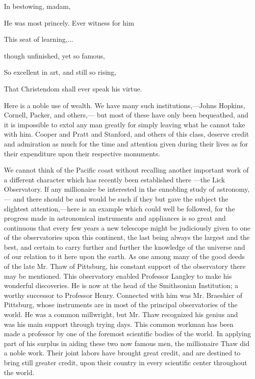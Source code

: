 \documentclass[11pt,openany]{book}
\begin{document}
In bestowing, madam,

He was most princely. Ever witness for him

This seat of learning,...

though unfinished, yet so famous,

So excellent in art, and still so rising,

That Christendom shall ever speak his virtue.

Here is a noble use of wealth. We have many such institutions,---Johns Hopkins, Cornell, Packer, and others,--- but most of these have only been bequeathed, and it is impossible to extol any man greatly for simply leaving what he cannot take with him. Cooper and Pratt and Stanford, and others of this class, deserve credit and admiration as much for the time and attention given during their lives as for their expenditure upon their respective monuments.

We cannot think of the Pacific coast without recalling another important work of a different character which has recently been established there ---the Lick Observatory. If any millionaire be interested in the ennobling study of astronomy,--- and there should be and would be such if they but gave the subject the slightest attention,---here is an example which could well be followed, for the progress made in astronomical instruments and appliances is so great and continuous that every few years a new telescope might be judiciously given to one of the observatories upon this continent, the last being always the largest and the best, and certain to carry further and further the knowledge of the universe and of our relation to it here upon the earth. As one among many of the good deeds of the late Mr. Thaw of Pittsburg, his constant support of the observatory there may be mentioned. This observatory enabled Professor Langley to make his wonderful discoveries. He is now at the head of the Smithsonian Institution; a worthy successor to Professor Henry. Connected with him was Mr. Braeshier of Pittsburg, whose instruments are in most of the principal observatories of the world. He was a common millwright, but Mr. Thaw recognized his genius and was his main support through trying days. This common workman has been made a professor by one of the foremost scientific bodies of the world. In applying part of his surplus in aiding these two now famous men, the millionaire Thaw did a noble work. Their joint labors have brought great credit, and are destined to bring still greater credit, upon their country in every scientific center throughout the world.
\end{document}
